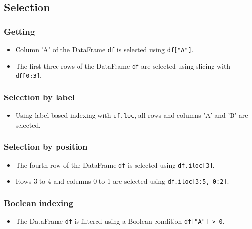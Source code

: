 \subsection{Selection}

\subsubsection{Getting}

\begin{itemize}
	
	\item Column 'A' of the DataFrame \texttt{df} is selected using \texttt{df["A"]}.
	
	\item The first three rows of the DataFrame \texttt{df} are selected using slicing with \texttt{df[0:3]}.
	
\end{itemize}

\subsubsection{Selection by label}
\begin{itemize}
	
	\item Using label-based indexing with \texttt{df.loc}, all rows and columns 'A' and 'B' are selected.
	
\end{itemize}

\subsubsection{Selection by position}
\begin{itemize}
	\item The fourth row of the DataFrame \texttt{df} is selected using \texttt{df.iloc[3]}.
	\item Rows 3 to 4 and columns 0 to 1 are selected using \texttt{df.iloc[3:5, 0:2]}.
\end{itemize}

\subsubsection{Boolean indexing}
\begin{itemize}
	\item The DataFrame \texttt{df} is filtered using a Boolean condition \texttt{df["A"] > 0}.
\end{itemize}

